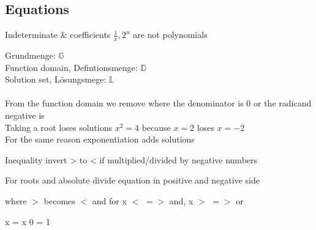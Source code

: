 \subsection{Equations}

Indeterminate \& coefficients
$\frac{1}{x}, 2^n$ are not polynomials

Grundmenge: $\mathbb{G}$ \\
Function domain, Defintionsmenge: $\mathbb{D}$ \\
Solution set, Lösungsmege: $\mathbb{L}$ \\
\\
From the function domain we remove where the denominator is 0 or the radicand negative is
\\
Taking a root loses solutions $x^2 = 4$ because $x = 2$ loses $x = -2$ \\
For the same reason exponentiation adds solutions

Inequality invert > to < if multiplied/divided by negative numbers

For roots and absolute divide equation in positive and negative side

where $>$ becomes $<$ and for x $<$ $=>$ and, x $>$ $=>$ or

x = x 
0 = 1